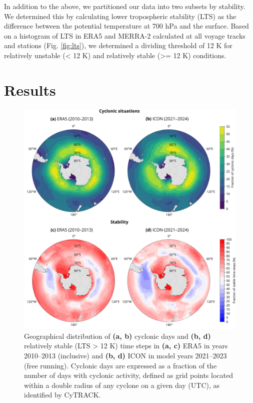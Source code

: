 \documentclass[12pt,a4paper]{article}
\begin{document}
In addition to the above, we partitioned our data into two subsets by
stability. We determined this by calculating lower tropospheric stability (LTS)
as the difference between the potential temperature at 700 hPa and the surface.
Based on a histogram of LTS in ERA5 and MERRA-2 calculated at all voyage tracks
and stations (Fig.  \ref{fig:lts}), we determined a dividing threshold of 12 K
for relatively unstable (< 12 K) and relatively stable (>= 12 K) conditions.

\section{Results}
\label{sec:results}

\begin{figure}[p!]
\centering
\includegraphics[width=\textwidth]{img/cyc_stab_dist.pdf}
\caption{
Geographical distribution of \textbf{(a, b)} cyclonic days and \textbf{(b, d)}
relatively stable (LTS > 12 K) time steps in \textbf{(a, c)} ERA5 in years
2010--2013 (inclusive) and \textbf{(b, d)} ICON in model years 2021--2023 (free
running). Cyclonic days are expressed as a fraction of the number of days with
cyclonic activity, defined as grid points located within a double radius of any
cyclone on a given day (UTC), as identified by CyTRACK.
}
\label{fig:cyclone-stability}
\end{figure}
\end{document}
